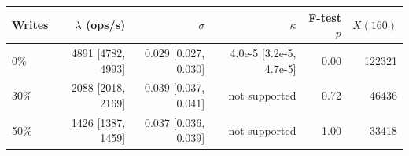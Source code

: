 \begin{tabular}{@{}lrrrrr@{}}
\toprule
Writes & $\lambda$ (ops/s) & $\sigma$ & $\kappa$ & F-test $p$ & $X(160)$ \\
\midrule
0\% & 4891 [4782, 4993] & 0.029 [0.027, 0.030] & 4.0e-5 [3.2e-5, 4.7e-5] & 0.00 & 122321 \\
30\% & 2088 [2018, 2169] & 0.039 [0.037, 0.041] & not supported & 0.72 & 46436 \\
50\% & 1426 [1387, 1459] & 0.037 [0.036, 0.039] & not supported & 1.00 & 33418 \\
\bottomrule
\end{tabular}
